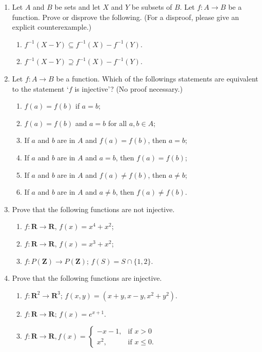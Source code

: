 \begin{enumerate}
\item Let $A$ and $B$ be sets and let $X$ and $Y$ be subsets of $B$. Let $f\colon A \to B$ be a function. Prove or disprove the following. (For a disproof, please give an explicit counterexample.)
 \begin{enumerate}
 \item $f^{-1}(X - Y) \subseteq f^{-1}(X) - f^{-1}(Y)$.
 \item $f^{-1}(X - Y) \supseteq f^{-1}(X) - f^{-1}(Y)$.
 \end{enumerate} 

\item Let $f \colon A \to B$ be a function. Which of the followings statements are equivalent to the statement `$f$ is injective'? (No proof necessary.)
 \begin{enumerate}
 \item $f(a) = f(b)$ if $a = b$;
 \item $f(a) = f(b)$ and $a = b$ for all $a,b \in A$;
 \item If $a$ and $b$ are in $A$ and $f(a) = f(b)$, then $a = b$;
 \item If $a$ and $b$ are in $A$ and $a = b$, then $f(a) = f(b)$;
 \item If $a$ and $b$ are in $A$ and $f(a) \neq f(b)$, then $a \neq b$;
 \item If $a$ and $b$ are in $A$ and $a \neq b$, then $f(a) \neq f(b)$. 
 \end{enumerate}
 
\item Prove that the following functions are not injective. 

\begin{enumerate}
 \item $f \colon \mathbf{R}\to \mathbf{R}$, $f(x) = x^4 + x^2$;
 \item $f \colon \mathbf{R}\to \mathbf{R}$, $f(x) = x^3 + x^2$;
 \item $f \colon P(\mathbf{Z}) \to P(\mathbf{Z});\, f(S) = S \cap \{1,2\}$.

 \end{enumerate}

\item Prove that the following functions are injective.
  \begin{enumerate}
  \item $f\colon \mathbf{R}^2 \to \mathbf{R}^3;\, f(x,y) =  (x+y,x-y,x^2 + y^2)$.
  \item $f \colon \mathbf{R} \to \mathbf{R};\, f(x) = e^{x+1}$.
\item $f\colon \mathbf{R}\to \mathbf{R}, f(x) =
 \begin{cases}
 -x-1, & \text{if $x > 0$} \\
 x^2, & \text{if $x \leq 0$}.
 \end{cases}
 $
\end{enumerate}


\end{enumerate}
